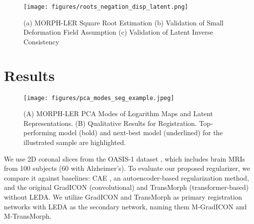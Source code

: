 

\begin{figure}[h]
    \centering
    \texttt{[image: figures/roots\_negation\_disp\_latent.png]}
    \vspace{-7mm}
    \caption{\small (a) MORPH-LER Square Root Estimation (b) Validation of Small Deformation Field Assumption (c) Validation of Latent Inverse Consistency}
    \vspace{-10mm}
    \label{fig:roots_and_negation}
\end{figure}

\section{Results}\label{results}
\begin{figure}[t]
    \centering
    \texttt{[image: figures/pca\_modes\_seg\_example.jpeg]}
    \vspace{-10mm}
    \caption{\small (A) MORPH-LER PCA Modes of Logarithm Maps and Latent Representations. (B) Qualitative Results for Registration. Top-performing model (bold) and next-best model (underlined) for the illustrated sample are highlighted.} %
    \label{fig:pca_mdes}
    \vspace{-12mm}
\end{figure}
We use 2D coronal slices from the OASIS-1 dataset \cite{marcus2007open}, which includes brain MRIs from 100 subjects (60 with Alzheimer's). To evaluate our proposed regularizer, we compare it against baselines: CAE \cite{bhalodia2019cooperative}, an autoencoder-based regularization method, and the original GradICON \cite{tian2023gradicon} (convolutional) and TransMorph \cite{chen2022transmorph} (transformer-based) without LEDA. We utilize GradICON and TransMorph as primary registration networks with LEDA as the secondary network, naming them M-GradICON and M-TransMorph.

